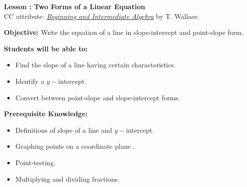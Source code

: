\documentclass[12pt]{article}
\theoremstyle{definition}
\begin{document}
{\bf \large Lesson : Two Forms of a Linear Equation}\\
CC attribute: \href{http://www.wallace.ccfaculty.org/book/book.html}{\it{Beginning and Intermediate Algebra}} by T. Wallace. \hfill \doclicenseImage[imagewidth=5em]\\
\par
{\bf Objective:} Write the equation of a line in slope-intercept and point-slope form.\\
\par
{\bf Students will be able to:}
\begin{itemize}
	\item Find the slope of a line having certain characteristics.
	\item Identify a $y-$intercept.
	\item Convert between point-slope and slope-intercept forms.
\end{itemize}
{\bf Prerequisite Knowledge:}
\begin{itemize}
	\item Definitions of slope of a line and $y-$intercept.
	\item Graphing points on a coordinate plane .
	\item Point-testing.
	\item Multiplying and dividing fractions.
\end{itemize}
\hrulefill
\end{document}
